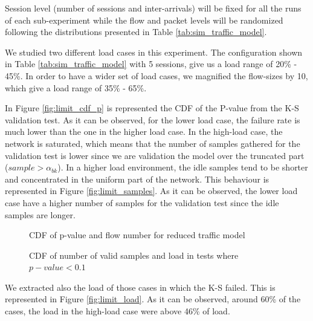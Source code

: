 Session level (number of sessions and inter-arrivals) will be fixed for all the runs of each sub-experiment while the flow and packet levels will be randomized following the distributions presented in Table \ref{tab:sim_traffic_model}.



We studied two different load cases in this experiment. The configuration shown in Table \ref{tab:sim_traffic_model} with 5 sessions, give us a load range of 20\% - 45\%. In order to have a wider set of load cases, we magnified the flow-sizes by 10, which give a load range of 35\% - 65\%.

In Figure \ref{fig:limit_cdf_p} is represented the CDF of the P-value from the \acs{K-S} validation test. As it can be observed, for the lower load case, the failure rate is much lower than the one in the higher load case. In the high-load case, the network is saturated, which means that the number of samples gathered for the validation test is lower since we are validation the model over the truncated part ($sample > \alpha_{bk}$). In a higher load environment, the idle samples tend to be shorter and concentrated in the uniform part of the network. This behaviour is represented in Figure \ref{fig:limit_samples}. As it can be observed, the lower load case have a higher number of samples for the validation test since the idle samples are longer.

\begin{figure}[h]
	\centering
	\caption{CDF of p-value and flow number for reduced traffic model}
\end{figure}

\begin{figure}[h!]
	\centering
	\caption{CDF of number of valid samples and load in tests where $p-value<0.1$}
\end{figure}

We extracted also the load of those cases in which the \acs{K-S} failed. This is represented in Figure \ref{fig:limit_load}. As it can be observed, around 60\% of the cases, the load in the high-load case were above 46\% of load.

